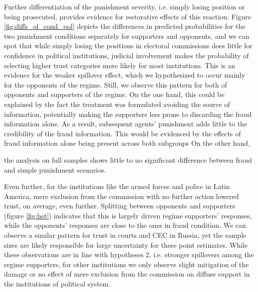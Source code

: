 \documentclass[11pt, ngerman,english,a4]{article}
\begin{document}
Further differentiation of the punishment severity, i.e. simply losing position or being prosecuted, provides evidence for restorative effects of this reaction. 
Figure \ref{fig:diffs_ol_cond_pol} depicts the differences in predicted probabilities for the two punishment conditions separately for supporters and opponents, and we can spot that while simply losing the positions in electoral commissions does little for confidence in political institutions, judicial involvement makes the probability of selecting higher trust categories more likely for most institutions. 
This is an evidence for the weaker spillover effect, which we hypothesized to occur mainly for the opponents of the regime. 
Still, we observe this pattern for both of opponents and supporters of the regime. 
On the one hand, this could be explained by the fact the treatment was formulated avoiding the source of information, potentially making the supporters less prone to discarding the fraud information alone. As a result, subsequent agents' punishment adds little to the credibility of the fraud information. 
This would be evidenced by the effects of fraud information alone being present across both subgroups
On the other hand, 



the analysis on full samples shows little to no significant difference between fraud and simple punishment scenarios. 

Even further, for the institutions like the armed forces and police in Latin America, mere exclusion from the commission with no further action lowered trust, on average, even further. Splitting between opponents and supporters (figure \ref{fig:het}) indicates that this is largely driven regime supporters' responses, while the opponents' responses are close to the ones in fraud condition. We can observe a similar pattern for trust in courts and CEC in Russia, yet the sample sizes are likely responsible for large uncertainty for these point estimates. While these observations are in line with hypotheses 2, i.e. stronger spillovers among the regime supporters, for other institutions we only observe slight mitigation of the damage or no effect of mere exclusion from the commission on diffuse support in the institutions of political system.
\end{document}
